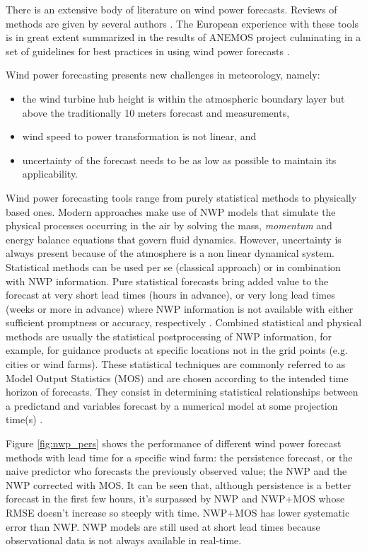 There is an extensive body of literature on wind power forecasts. Reviews of methods are given by several authors \citep{Giebel2003, Costa2008, Lei2009, Sweeney2011, Foley2012}. The European experience with these tools is in great extent summarized  in the results of ANEMOS project \citep{Giebel2006, Kariniotakis2006} culminating in a set of guidelines for best practices in using wind power forecasts \citep{Giebel2007}.

Wind power forecasting presents new challenges in meteorology, namely:

\begin{itemize}
    \item the wind turbine hub height is within the atmospheric boundary layer but above the traditionally 10 meters forecast and measurements,
    \item wind speed to power transformation is not linear, and
    \item uncertainty of the forecast needs to be as low as possible to maintain its applicability.
\end{itemize} 

Wind power forecasting tools range from purely statistical methods to physically based ones. Modern approaches make use of NWP models that simulate the physical processes occurring in the air by solving the mass, \textit{momentum} and energy balance equations that govern fluid dynamics. However, uncertainty is always present because of the atmosphere is a non linear dynamical system. Statistical methods can be used per se (classical approach) or in combination with NWP information. Pure statistical forecasts bring added value to the forecast at very short lead times (hours in advance), or very long lead times (weeks or more in advance) where NWP information is not available with either sufficient promptness or accuracy, respectively \citep{Wilks2005}. Combined statistical and physical methods are usually the statistical postprocessing of NWP information, for example, for guidance products at specific locations not in the grid points (e.g. cities or wind farms). These statistical techniques are commonly referred to as Model Output Statistics (MOS) and are chosen according to the intended time horizon of forecasts. They consist in determining statistical relationships between a predictand and variables forecast by a numerical model at some projection time(s) \citep{GlahnLowry1972}. 

Figure \ref{fig:nwp_pers} shows the performance of different wind power forecast methods with lead time for a specific wind farm: the persistence forecast, or the naive predictor who forecasts the previously observed value; the NWP and the NWP corrected with MOS. It can be seen that, although persistence is a better forecast in the first few hours, it's surpassed by NWP and NWP+MOS whose RMSE doesn't increase so steeply with time. NWP+MOS has lower systematic error than NWP. NWP models are still used at short lead times because observational data is not always available in real-time.

